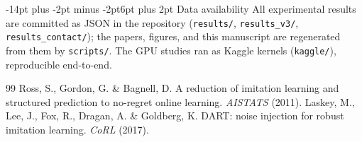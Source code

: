 \documentclass[10pt]{article}
\makeatletter
\renewcommand\section{\@startsection{section}{1}{\z@}%
  {-14pt plus -2pt minus -2pt}{6pt plus 2pt}%
  {\normalfont\bfseries\large}}
\makeatother
\begin{document}
\section{Data availability}
All experimental results are committed as JSON in the repository
(\texttt{results/}, \texttt{results\_v3/}, \texttt{results\_contact/}); the
papers, figures, and this manuscript are regenerated from them by
\texttt{scripts/}. The GPU studies ran as Kaggle kernels
(\texttt{kaggle/}), reproducible end-to-end.

\begin{thebibliography}{99}
 Ross, S., Gordon, G. \& Bagnell, D. A reduction of
imitation learning and structured prediction to no-regret online learning.
\emph{AISTATS} (2011).
 Laskey, M., Lee, J., Fox, R., Dragan, A. \&
Goldberg, K. DART: noise injection for robust imitation learning.
\emph{CoRL} (2017).
\end{thebibliography}
\end{document}

